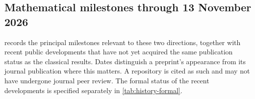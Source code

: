 \documentclass[11pt,letterpaper]{article}
\theoremstyle{definition}
\begin{document}
\subsection{Mathematical milestones through 13 November 2026}

 records the principal milestones relevant to
these two directions, together with recent public developments that have
not yet acquired the same publication status as the classical results.
Dates distinguish a preprint's appearance from its journal publication
where this matters.  A repository is cited as such and may not have undergone journal peer review.  The formal status
of the recent developments is specified separately in
\cref{tab:history-formal}.

\begingroup
\footnotesize
\renewcommand{\arraystretch}{1.18}
\setlength{\LTpre}{6pt}
\setlength{\LTpost}{6pt}
\end{document}
